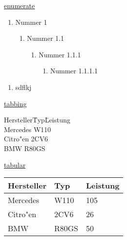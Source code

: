 \documentclass[11pt,twocolumn,vertical]{book}
\begin{document}

\hrulefill

\underline{enumerate}

\begin{enumerate}
  \item Nummer 1
  \begin{enumerate}
    \item Nummer 1.1
    \begin{enumerate}
      \item Nummer 1.1.1
      \begin{enumerate}
        \item Nummer 1.1.1.1
      \end{enumerate}
    \end{enumerate}
  \end{enumerate}
\end{enumerate}
\begin{enumerate}
\item sdflkj
\end{enumerate}


\hrulefill

\newpage


\underline{tabbing}

\begin{tabbing}
  Hersteller\quad\= Typ\quad\= Leistung \\[1ex]
  Mercedes \> W110  \\
  Citro"en \> 2CV6  \\
  BMW \> R80GS 
\end{tabbing}


\hrulefill

\underline{tabular}

\begin{tabular}{|p{2.5cm}|p{2.5cm}||p{2.5cm}|}
 \hline
  Hersteller & Typ & Leistung \\[1ex]
 \hline
 \hline
  Mercedes & W110 & 105 \\
 \hline
  Citro"en & 2CV6 & 26 \\
 \hline
  BMW & R80GS & 50 \\
 \hline
\end{tabular}
\end{document}
